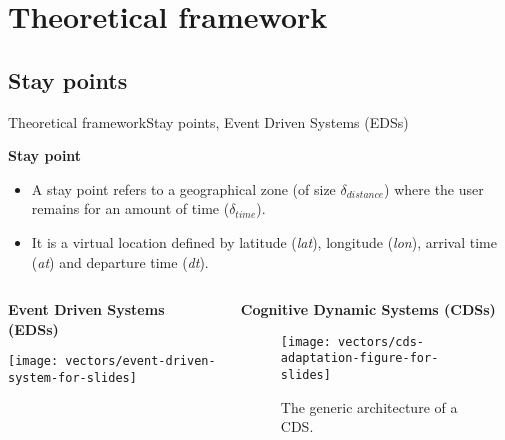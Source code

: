 \section{Theoretical framework}
\subsection{Stay points}
\begin{frame}{Theoretical framework}{Stay points, Event Driven Systems (EDSs)}
\vspace{-0.2cm}
\small
\begin{block}{\small \textbf{Stay point}}
\begin{itemize}
  \item A stay point refers to a geographical zone (of size $\delta_{distance}$) where the user remains for an amount of time ($\delta_{time}$).
  \item It is a virtual location defined by latitude (\emph{lat}), longitude (\emph{lon}), arrival time (\emph{at}) and departure time (\emph{dt}).
\end{itemize}
\end{block}

\vspace{-0.2cm}
\begin{columns}
\begin{column}{0.5\textwidth}
\begin{block}{\small \textbf{Event Driven Systems (EDSs)}}
{
    \centering
    \texttt{[image: vectors/event-driven-system-for-slides]}
    \par
}
\end{block}
\end{column}

\begin{column}{0.5\textwidth}
\begin{block}{\small \textbf{Cognitive Dynamic Systems (CDSs)}}
\begin{figure}
    \texttt{[image: vectors/cds-adaptation-figure-for-slides]}
    \caption{The generic architecture of a CDS.}
\end{figure}
\end{block}
\end{column}
\end{columns}







\end{frame}
